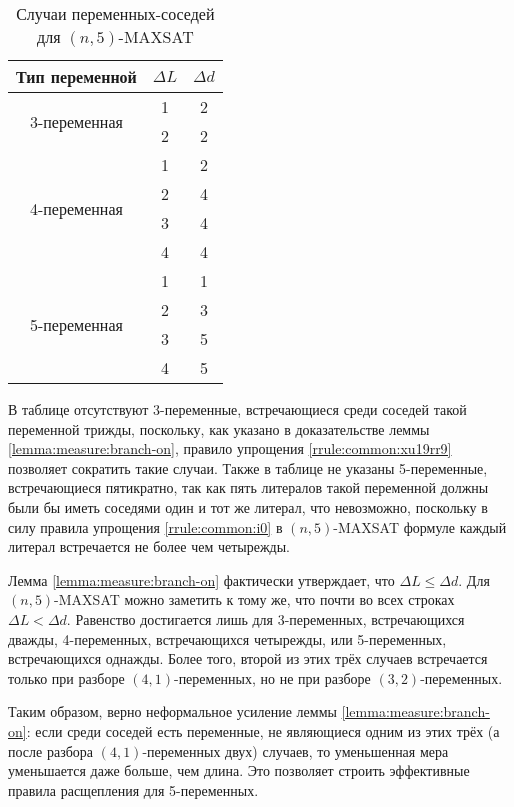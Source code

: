 \begin{table}[ht]
 \centering
 \caption{Случаи переменных-соседей для $(n,5)$-MAXSAT}
 \begin{tabular}{|c|c|c|}
  \hline
  Тип переменной & $\Delta L$ & $\Delta d$ \\
  \hline\hline
  \multirow{2}{*}{3-переменная}
                 & 1          & 2 \\
                 & 2          & 2 \\
  \hline
  \multirow{4}{*}{4-переменная}
                 & 1          & 2 \\
                 & 2          & 4 \\
                 & 3          & 4 \\
                 & 4          & 4 \\
  \hline
  \multirow{4}{*}{5-переменная}
                 & 1          & 1 \\
                 & 2          & 3 \\
                 & 3          & 5 \\
                 & 4          & 5 \\
  \hline
 \end{tabular}
 \label{table:n5:varcases}
\end{table}

В таблице отсутствуют 3-переменные, встречающиеся среди соседей такой переменной трижды, поскольку, как указано в доказательстве леммы \ref{lemma:measure:branch-on}, правило упрощения \ref{rrule:common:xu19rr9} позволяет сократить такие случаи. Также в таблице не указаны 5-переменные, встречающиеся пятикратно, так как пять литералов такой переменной должны были бы иметь соседями один и тот же литерал, что невозможно, поскольку в силу правила упрощения \ref{rrule:common:i0} в $(n,5)$-MAXSAT формуле каждый литерал встречается не более чем четырежды.

Лемма \ref{lemma:measure:branch-on} фактически утверждает, что $\Delta L \leq \Delta d$. Для $(n,5)$-MAXSAT можно заметить к тому же, что почти во всех строках $\Delta L < \Delta d$. Равенство достигается лишь для 3-переменных, встречающихся дважды, 4-переменных, встречающихся четырежды, или 5-переменных, встречающихся однажды. Более того, второй из этих трёх случаев встречается только при разборе $(4,1)$-переменных, но не при разборе $(3,2)$-переменных.

Таким образом, верно неформальное усиление леммы \ref{lemma:measure:branch-on}: если среди соседей есть переменные, не являющиеся одним из этих трёх (а после разбора $(4,1)$-переменных двух) случаев, то уменьшенная мера уменьшается даже больше, чем длина. Это позволяет строить эффективные правила расщепления для 5-переменных.

